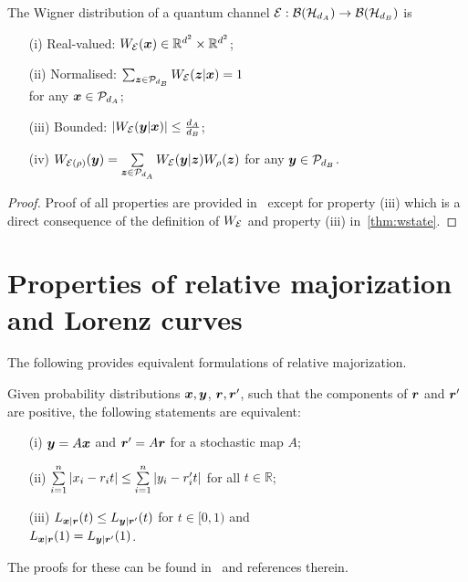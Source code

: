 \documentclass[pra,
aps,
twocolumn,
superscriptaddress,
groupedaddress,
nofootinbib,
reprint
]{revtex4-1}
\begin{document}
\begin{proposition}
    \label{thm:wchannel}
    The Wigner distribution of a quantum channel ${\mathcal E}: \mathcal{B}(\mathcal{H}_{d_A}) \rightarrow \mathcal{B}(\mathcal{H}_{d_B})$ is
    \begin{enumerate}
        \item[(i)]\label{en:wo1} Real-valued: $\W{\E}(\x) \in \mathbb{R}^{d^2} \times \mathbb{R}^{d^2}$;
        \item[(ii)]\label{en:wo2} Normalised: $\sum_{\bmz \in \cal{P}_{d_B}} \W[\bmz|\bmx]{\E} = 1$ \\ 
        for any $\bm{x} \in \mathcal{P}_{d_A}$;
        \item[(iii)]\label{en:wo3} Bounded: $\abs{\W[\bmy|\bmx]{\E}} \leq \frac{d_A}{d_B}$;
	    \item[(iv)]\label{en:wo4} $\W[\bmy]{\E(\rho)} = \sum\limits_{\bmz \in \cal{P}_{d_{A}}} \W[\bmy|\bmz]{\E} \W[\bmz]{\rho}$ for any $\bm{y} \in \mathcal{P}_{d_B}$.
    \end{enumerate}
\end{proposition}
\begin{proof}
	Proof of all properties are provided in~\cite{Wang_2019} except for property (iii) which is a direct consequence of the definition of $\W{\E}$ and property (iii) in~\cref{thm:wstate}.
\end{proof}


\section{Properties of relative majorization and Lorenz curves}
\label{app:major}
	
The following provides equivalent formulations of relative majorization. 

\begin{proposition}\label{prop:rmajor}
Given probability distributions $\bm{x}, \bm{y}$, $\boldsymbol{r} , \boldsymbol{r}'$, such that the components of $\boldsymbol{r}$ and $\boldsymbol{r}'$ are positive, the following statements are equivalent:
  \begin{enumerate}
    \item[(i)] $\bm{y} = A\bm{x}$ and $\boldsymbol{r}' = A\boldsymbol{r}$ for a stochastic map $A$;
    \item[(ii)]\label{en:tm3} $\sum\limits_{i=1}^n \abs{x_i - r_i t} \leq \sum\limits_{i=1}^n \abs{y_i - r'_i t}$ for all $t \in \mathbb{R}$;
    \item[(iii)] $L_{\bm{x}|\boldsymbol{r}}(t) \leq L_{\bm{y}|\boldsymbol{r}'}(t)$ for $t\in [0,1)$ and \vspace{5pt}\\ $L_{\bm{x}|\boldsymbol{r}}(1) = L_{\bm{y}|\boldsymbol{r}'}(1)$.
  \end{enumerate}
\end{proposition}
The proofs for these can be found in~\cite{cit:marshall,ruch_mixing_1978,Renes_2016,Buscemi_2017} and references therein.
\end{document}
